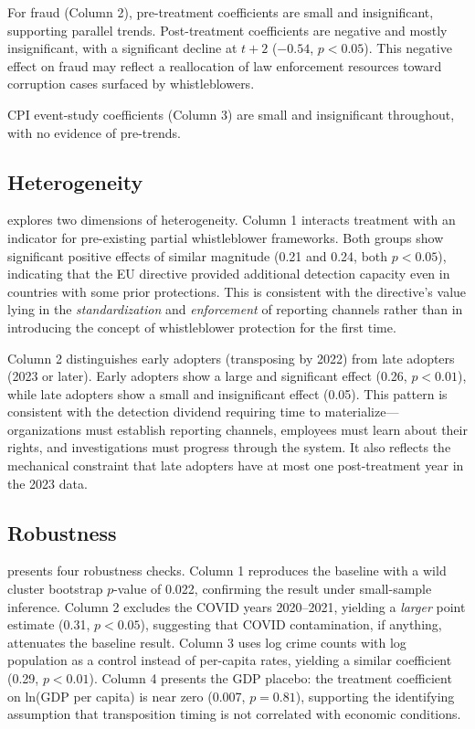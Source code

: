 \documentclass[12pt]{article}
\begin{document}
For fraud (Column 2), pre-treatment coefficients are small and insignificant, supporting parallel trends. Post-treatment coefficients are negative and mostly insignificant, with a significant decline at $t + 2$ ($-0.54$, $p < 0.05$). This negative effect on fraud may reflect a reallocation of law enforcement resources toward corruption cases surfaced by whistleblowers.

CPI event-study coefficients (Column 3) are small and insignificant throughout, with no evidence of pre-trends.

\subsection{Heterogeneity}



 explores two dimensions of heterogeneity. Column 1 interacts treatment with an indicator for pre-existing partial whistleblower frameworks. Both groups show significant positive effects of similar magnitude (0.21 and 0.24, both $p < 0.05$), indicating that the EU directive provided additional detection capacity even in countries with some prior protections. This is consistent with the directive's value lying in the \textit{standardization} and \textit{enforcement} of reporting channels rather than in introducing the concept of whistleblower protection for the first time.

Column 2 distinguishes early adopters (transposing by 2022) from late adopters (2023 or later). Early adopters show a large and significant effect (0.26, $p < 0.01$), while late adopters show a small and insignificant effect (0.05). This pattern is consistent with the detection dividend requiring time to materialize---organizations must establish reporting channels, employees must learn about their rights, and investigations must progress through the system. It also reflects the mechanical constraint that late adopters have at most one post-treatment year in the 2023 data.

\subsection{Robustness}



 presents four robustness checks. Column 1 reproduces the baseline with a wild cluster bootstrap $p$-value of 0.022, confirming the result under small-sample inference. Column 2 excludes the COVID years 2020--2021, yielding a \textit{larger} point estimate (0.31, $p < 0.05$), suggesting that COVID contamination, if anything, attenuates the baseline result. Column 3 uses log crime counts with log population as a control instead of per-capita rates, yielding a similar coefficient (0.29, $p < 0.01$). Column 4 presents the GDP placebo: the treatment coefficient on ln(GDP per capita) is near zero (0.007, $p = 0.81$), supporting the identifying assumption that transposition timing is not correlated with economic conditions.
\end{document}

